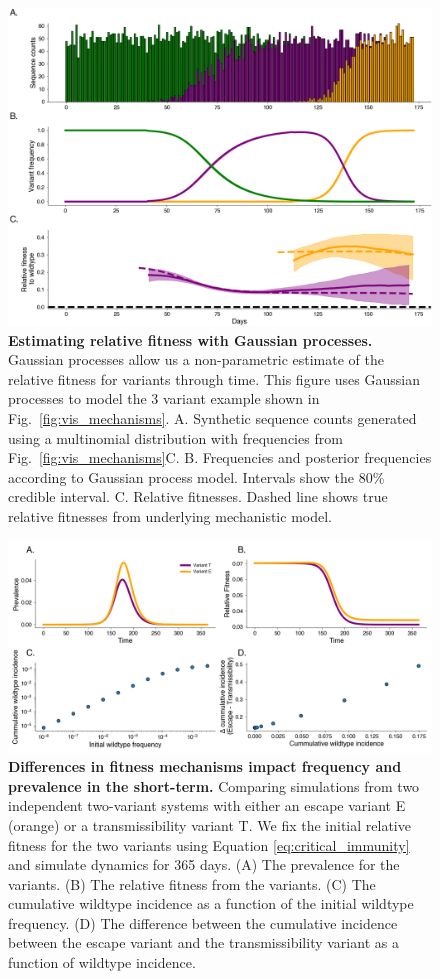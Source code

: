 \documentclass[11pt,oneside,letterpaper]{article}
\begin{document}
\begin{figure}[h]
    \centering
    \includegraphics[width=0.8\linewidth]{./figures/gp_example.png}
    \caption{\textbf{Estimating relative fitness with Gaussian processes.}
    Gaussian processes allow us a non-parametric estimate of the relative fitness for variants through time.
    This figure uses Gaussian processes to model the 3 variant example shown in Fig.~\ref{fig:vis_mechanisms}.
    A. Synthetic sequence counts generated using a multinomial distribution with frequencies from Fig.~\ref{fig:vis_mechanisms}C.
    B. Frequencies and posterior frequencies according to Gaussian process model. Intervals show the 80\% credible interval.
    C. Relative fitnesses. Dashed line shows true relative fitnesses from underlying mechanistic model.
}
    \label{fig:gp_example}
\end{figure}

\begin{figure}[h]
    \centering
    \includegraphics[width=0.8\linewidth]{./figures/short_term_divergence.png}
    \caption{\textbf{Differences in fitness mechanisms impact frequency and prevalence in the short-term.}
    Comparing simulations from two independent two-variant systems with either an escape variant E (orange) or a transmissibility variant T.
    We fix the initial relative fitness for the two variants using Equation \ref{eq:critical_immunity} and simulate dynamics for 365 days.
    (A) The prevalence for the variants.
    (B) The relative fitness from the variants.
    (C) The cumulative wildtype incidence as a function of the initial wildtype frequency.
    (D) The difference between the cumulative incidence between the escape variant and the transmissibility variant as a function of wildtype incidence.
    }%
    \label{fig:short_term_divergence}
\end{figure}
\end{document}
